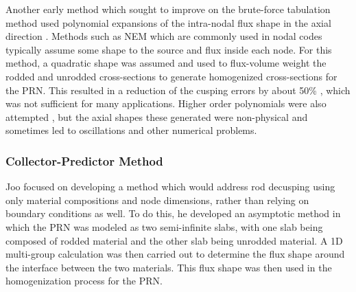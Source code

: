 Another early method which sought to improve on the brute-force tabulation method used polynomial expansions of the intra-nodal flux shape in the axial direction \cite{bennewitz1975higher,finnemann1981space}.  Methods such as NEM which are commonly used in nodal codes typically assume some shape to the source and flux inside each node.  For this method, a quadratic shape was assumed and used to flux-volume weight the rodded and unrodded cross-sections to generate homogenized cross-sections for the PRN.  This resulted in a reduction of the cusping errors by about 50\% \cite{KordSmithMastersThesis1979AnalyticNodalMethod}, which was not sufficient for many applications.  Higher order polynomials were also attempted \cite{langenbuch1977coarse}, but the axial shapes these generated were non-physical and sometimes led to oscillations and other numerical problems.

\subsubsection{Collector-Predictor Method}

Joo \cite{HanSemJooThesis1984} focused on developing a method which would address rod decusping using only material compositions and node dimensions, rather than relying on boundary conditions as well.  To do this, he developed an asymptotic method in which the PRN was modeled as two semi-infinite slabs, with one slab being composed of rodded material and the other slab being unrodded material.  A 1D multi-group calculation was then carried out to determine the flux shape around the interface between the two materials.  This flux shape was then used in the homogenization process for the PRN.

